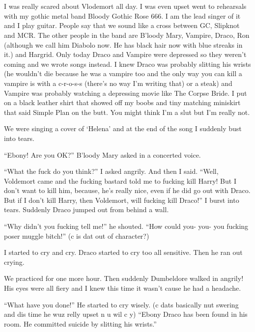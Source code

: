 \section{}



I was really scared about Vlodemort all day. I was even upset went to rehearsals with my gothic metal band Bloody Gothic Rose 666. I am the lead singer of it and I play guitar. People say that we sound like a cross between GC, Slipknot and MCR\@. The other people in the band are B'loody Mary, Vampire, Draco, Ron (although we call him Diabolo now. He has black hair now with blue streaks in it.) and Hargrid. Only today Draco and Vampire were depressed so they weren't coming and we wrote songs instead. I knew Draco was probably slitting his wrists (he wouldn't die because he was a vampire too and the only way you can kill a vampire is with a c-r-o-s-s (there's no way I'm writing that) or a steak) and Vampire was probably watching a depressing movie like The Corpse Bride. I put on a black leather shirt that showed off my boobs and tiny matching miniskirt that said Simple Plan on the butt. You might think I'm a slut but I'm really not.

We were singing a cover of \enquote*{Helena} and at the end of the song I suddenly bust into tears.

\enquote{Ebony! Are you OK\@?} B'loody Mary asked in a concerted voice.

\enquote{What the fuck do you think?} I asked angrily. And then I said. \enquote{Well, Voldemort came and the fucking bastard told me to fucking kill Harry! But I don't want to kill him, because, he's really nice, even if he did go out with Draco. But if I don't kill Harry, then Voldemort, will fucking kill Draco!} I burst into tears.
Suddenly Draco jumped out from behind a wall.

\enquote{Why didn't you fucking tell me!} he shouted. \enquote{How could you- you- you fucking poser muggle bitch!} (c is dat out of character?)

I started to cry and cry. Draco started to cry too all sensitive. Then he ran out crying.

We practiced for one more hour. Then suddenly Dumbeldore walked in angrily! His eyes were all fiery and I knew this time it wasn't cause he had a headache.

\enquote{What have you done!} He started to cry wisely. (c dats basically nut swering and dis time he wuz relly upset n u wil c y) \enquote{Ebony Draco has been found in his room. He committed suicide by slitting his wrists.}
